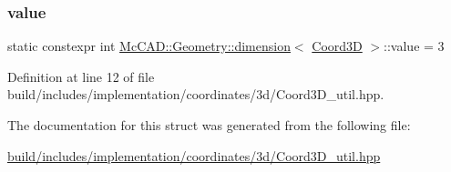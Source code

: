 \subsubsection{\texorpdfstring{value}{value}}
{\footnotesize\ttfamily static constexpr int \hyperlink{structMcCAD_1_1Geometry_1_1dimension}{Mc\+C\+A\+D\+::\+Geometry\+::dimension}$<$ \hyperlink{classMcCAD_1_1Geometry_1_1Coord3D}{Coord3D} $>$\+::value = 3\hspace{0.3cm}{\ttfamily [static]}}



Definition at line 12 of file build/includes/implementation/coordinates/3d/\+Coord3\+D\+\_\+util.\+hpp.



The documentation for this struct was generated from the following file\+:\begin{DoxyCompactItemize}
\item 
\hyperlink{build_2includes_2implementation_2coordinates_23d_2Coord3D__util_8hpp}{build/includes/implementation/coordinates/3d/\+Coord3\+D\+\_\+util.\+hpp}\end{DoxyCompactItemize}
